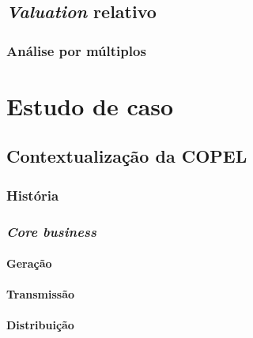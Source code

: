 \documentclass[grad,numbers]{coppe}
\begin{document}
  \hypertarget{valuation-relativo}{%
  \section{\texorpdfstring{\emph{Valuation} relativo}{Valuation relativo}}\label{valuation-relativo}}
  
  \hypertarget{anuxe1lise-por-muxfaltiplos}{%
  \subsection{Análise por múltiplos}\label{anuxe1lise-por-muxfaltiplos}}
  
  \hypertarget{estudo-de-caso}{%
  \chapter{Estudo de caso}\label{estudo-de-caso}}
  
  \hypertarget{contextualizauxe7uxe3o-da-copel}{%
  \section{Contextualização da COPEL}\label{contextualizauxe7uxe3o-da-copel}}
  
  \hypertarget{histuxf3ria}{%
  \subsection{História}\label{histuxf3ria}}
  
  \hypertarget{core-business}{%
  \subsection{\texorpdfstring{\emph{Core business}}{Core business}}\label{core-business}}
  
  \hypertarget{gerauxe7uxe3o-1}{%
  \subsubsection{Geração}\label{gerauxe7uxe3o-1}}
  
  \hypertarget{transmissuxe3o-1}{%
  \subsubsection{Transmissão}\label{transmissuxe3o-1}}
  
  \hypertarget{distribuiuxe7uxe3o-1}{%
  \subsubsection{Distribuição}\label{distribuiuxe7uxe3o-1}}
  
\end{document}

